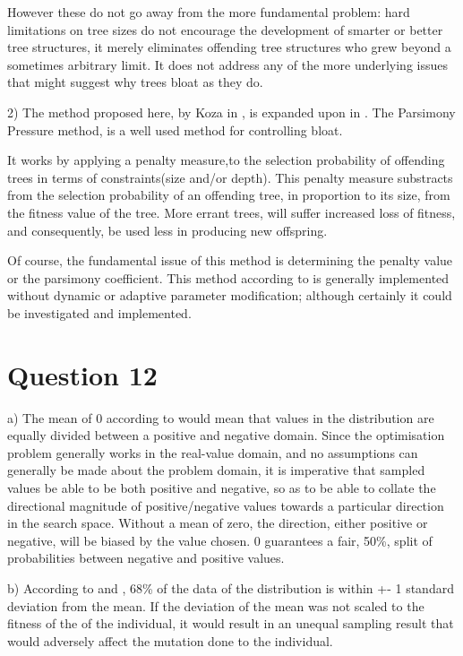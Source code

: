 \documentclass[12pt]{article}
\begin{document}
		However these do not go away from the more fundamental problem: hard limitations on tree sizes do not encourage the development of smarter or better tree structures, it merely eliminates offending tree structures who grew beyond a sometimes arbitrary limit. It does not address any of the more underlying issues that might suggest why trees bloat as they do.

		2) The method proposed here, by Koza in \cite{koza_1998}, is expanded upon in \cite{poli_mcphee_2013_1}. The Parsimony Pressure method, is a well used method for controlling bloat.

		It works by applying a penalty measure,to the selection probability of offending trees in terms of constraints(size and/or depth). This penalty measure substracts from the selection probability of an offending tree, in proportion to its size, from the fitness value of the tree. More errant trees, will suffer increased loss of fitness, and consequently, be used less in producing new offspring.

		Of course, the fundamental issue of this method is determining the penalty value or the parsimony coefficient. This method according to \cite{Poli:2008:FGG:1796422} is generally implemented without dynamic or adaptive parameter modification; although certainly it could be investigated and implemented.
\section{Question 12}
a) The mean of 0 according to \cite{normal_distribution} would mean that values in the distribution are equally divided between a positive and negative domain. Since the optimisation problem generally works in the real-value domain, and no assumptions can generally be made about the problem domain, it is imperative that sampled values be able to be both positive and negative, so as to be able to collate the directional magnitude of positive/negative values towards a particular direction in the search space. Without a mean of zero, the direction, either positive or negative, will be biased by the value chosen. 0 guarantees a fair, 50\%, split of probabilities between negative and positive values.

	b) According to \cite{normal_distribution} and \cite{areas_under_normal_distribution}, 68\% of the data of the distribution is within +- 1 standard deviation from the mean. If the deviation of the mean was not scaled to the fitness of the of the individual, it would result in an unequal sampling result that would adversely affect the mutation done to the individual.
\end{document}
